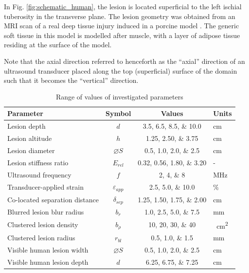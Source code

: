 		In Fig. \ref{fig:schematic_human}, the lesion is located superficial to the left ischial tuberosity in the transverse plane. The lesion geometry was obtained from an MRI scan of a real deep tissue injury induced in a porcine model \cite{solis13}. The generic soft tissue in this model is modelled after muscle, with a layer of adipose tissue residing at the surface of the model.

		Note that the axial direction referred to henceforth as the ``axial'' direction of an ultrasound transducer placed along the top (superficial) surface of the domain such that it becomes the ``vertical'' direction.

		\begin{table}[!htb]
			\centering
			\caption[Quasi-static model investigated parameters]{Range of values of investigated parameters}
			\label{tab:quasi-parametervalues}
			\begin{tabular}{lccs[table-unit-alignment = left]}
				\toprule
				Parameter & Symbol & Values & Units \\
				\midrule
				Lesion depth & $d$ & \numlist{3.5;6.5;8.5;10.0} & \si{\cm} \\
				Lesion altitude & $h$ & \numlist{1.25;2.50;3.75} & \si{\cm} \\
				Lesion diameter & $\diameter S$ & \numlist{0.5;1.0;2.0;2.5} & \si{\cm} \\
				Lesion stiffness ratio & $E_{rel}$ & \numlist{0.32;0.56;1.80;3.20} & - \\
				Ultrasound frequency & $f$ & \numlist{2;4;8} & \si{\MHz} \\
				Transducer-applied strain & $\varepsilon_{app}$ & \numlist{2.5;5.0;10.0} & \si{\percent} \\
				Co-located separation distance & $\delta_{sep}$ & \numlist{1.25;1.50;1.75;2.00} & \si{\cm} \\
				Blurred lesion blur radius & $b_r$ & \numlist{1.0;2.5;5.0;7.5} & \si{\mm} \\
				Clustered lesion density & $b_\rho$ & \numlist{10;20;30;40} & \si{\per\cm\squared} \\
				Clustered lesion radius & $r_{bl}$ & \numlist{0.5;1.0;1.5} & \si{\mm} \\
				Visible human lesion width & $\diameter S$ & \numlist{0.5;1.0;2.0;2.5} & \si{\cm} \\
				Visible human lesion depth & $d$ & \numlist{6.25;6.75;7.25} & \si{\cm} \\
				\bottomrule
			\end{tabular}
		\end{table}

